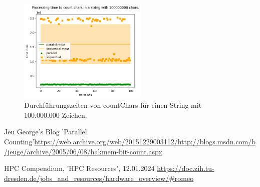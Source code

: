 \documentclass[plainarticle,zihtitle,german,final,hyperref,utf8]{zihpub}
\begin{document}
\begin{figure}[h]
	\begin{center}
		\includegraphics[width=0.55\textwidth]{images/comp_count_100000000.png}
		\caption{Durchführungszeiten von countChars für einen String mit 100.000.000 Zeichen.}
		\label{fig:count_comp_100M}
	\end{center}
\end{figure}

\newpage
\begin{thebibliography}{9}
	Jeu George's Blog 'Parallel Counting'\newline \url{https://web.archive.org/web/20151229003112/http://blogs.msdn.com/b/jeuge/archive/2005/06/08/hakmem-bit-count.aspx}
	
	HPC Compendium, 'HPC Resources', 12.01.2024\newline
	\url{https://doc.zih.tu-dresden.de/jobs_and_resources/hardware_overview/#romeo}
\end{thebibliography}
\end{document}
